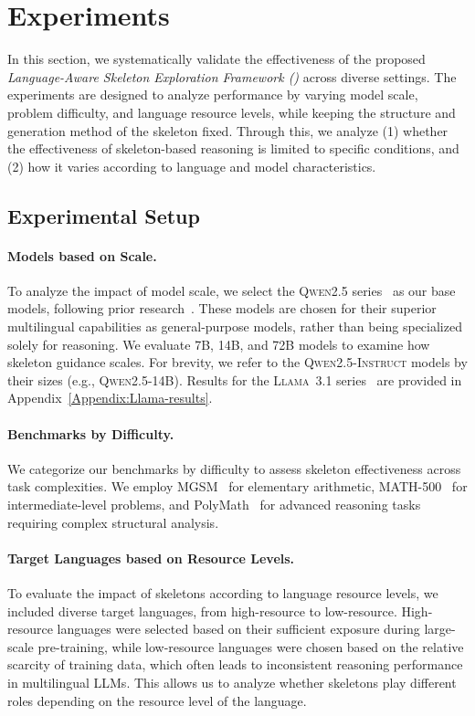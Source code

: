 \section{Experiments}

In this section, we systematically validate the effectiveness of the proposed \emph{Language-Aware Skeleton Exploration Framework (\Lasef)} across diverse settings. The experiments are designed to analyze performance by varying model scale, problem difficulty, and language resource levels, while keeping the structure and generation method of the skeleton fixed. Through this, we analyze (1) whether the effectiveness of skeleton-based reasoning is limited to specific conditions, and (2) how it varies according to language and model characteristics.

\subsection{Experimental Setup}
\paragraph{Models based on Scale.} 
To analyze the impact of model scale, we select the \textsc{Qwen2.5} series~\citep{qwen2025qwen25technicalreport} as our base models, following prior research~\citep{qi2025sot}. These models are chosen for their superior multilingual capabilities as general-purpose models, rather than being specialized solely for reasoning. We evaluate 7B, 14B, and 72B models to examine how skeleton guidance scales. For brevity, we refer to the \textsc{Qwen2.5-Instruct} models by their sizes (e.g., \textsc{Qwen2.5-14B}). Results for the \textsc{Llama~3.1} series~\citep{grattafiori2024llama3herdmodels} are provided in Appendix~\ref{Appendix:Llama-results}.

\paragraph{Benchmarks by Difficulty.} 
We categorize our benchmarks by difficulty to assess skeleton effectiveness across task complexities. We employ MGSM~\citep{shi2022language} for elementary arithmetic, MATH-500~\citep{lightman2023let} for intermediate-level problems, and PolyMath~\citep{wang2025polymath} for advanced reasoning tasks requiring complex structural analysis.

\paragraph{Target Languages based on Resource Levels.} To evaluate the impact of skeletons according to language resource levels, we included diverse target languages, from high-resource to low-resource. High-resource languages were selected based on their sufficient exposure during large-scale pre-training, while low-resource languages were chosen based on the relative scarcity of training data, which often leads to inconsistent reasoning performance in multilingual LLMs. This allows us to analyze whether skeletons play different roles depending on the resource level of the language.

